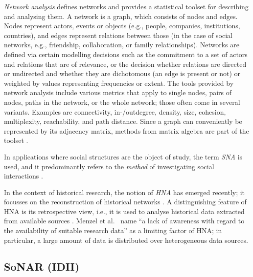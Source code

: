 \emph{Network analysis}
defines networks and provides a statistical toolset for describing and analysing them.
A network is a graph, which consists of nodes and edges.
Nodes represent actors, events or objects (e.g., people, companies, institutions, countries),
and edges represent relations between those (in the case of social networks, e.g.,
friendship, collaboration, or family relationships).
Networks are defined via certain modelling decisions
such as the commitment to a set of actors and relations that are of relevance,
or the decision whether relations are directed or undirected
and whether they are dichotomous (an edge is present or not)
or weighted by values representing frequencies or extent.
The tools provided by network analysis include
various metrics that apply to single nodes, pairs of nodes, paths in the network,
or the whole network; those often come in several variants.
Examples are connectivity, in-/outdegree, density,
size, cohesion, multiplexity, reachability, and path distance.
Since a graph can conveniently be represented by its adjacency matrix,
methods from matrix algebra are part of the toolset \autocite[cf.][§§1.1, 3.3, 5.3]{Jansen2003}.

In applications where social structures are the object of study,
the term \emph{\gls{SNA}} is used,
and it predominantly refers to the \emph{method} of investigating
social interactions \autocite{Otte2002}.

In the context of historical research,
the notion of \emph{\gls{HNA}}
has emerged recently; it focusses on the reconstruction of
historical networks \autocite{Menzel2020}.
A distinguishing feature of \gls{HNA} is its retrospective view,
i.e., it is used to analyse historical data extracted
from available sources \autocite{Fangerau2022}.
Menzel et al.\ \autocite*{Menzel2020} name
\enquote{a lack of awareness with regard to the availability of suitable research data}
as a limiting factor of \gls{HNA};
in particular, a large amount of data is distributed over heterogeneous data sources.

\subsection{SoNAR (IDH)}

